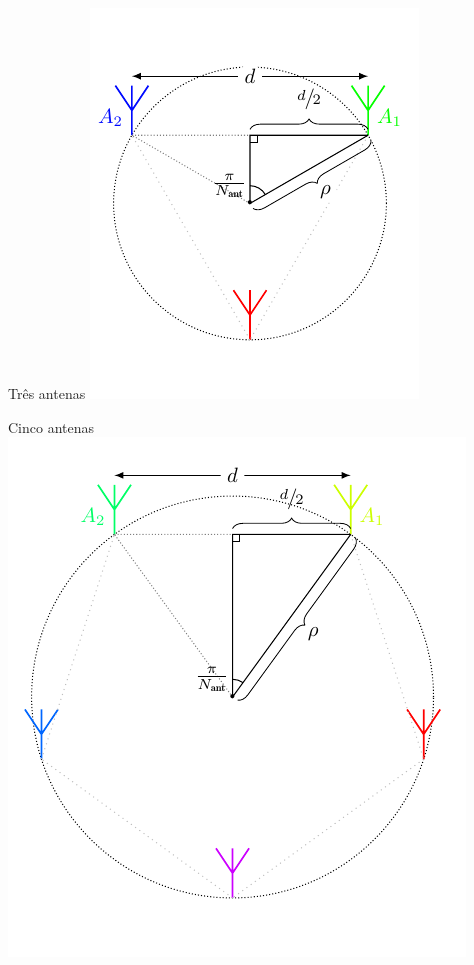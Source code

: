     \begin{frame}{Três antenas}
        \centering%
            \includegraphics[scale=0.8]{../pictures/antennas_3.pdf}%
    \end{frame}
    \begin{frame}{Cinco antenas}
        \centering%
            \includegraphics[scale=0.8]{../pictures/antennas_5.pdf}%
    \end{frame}
